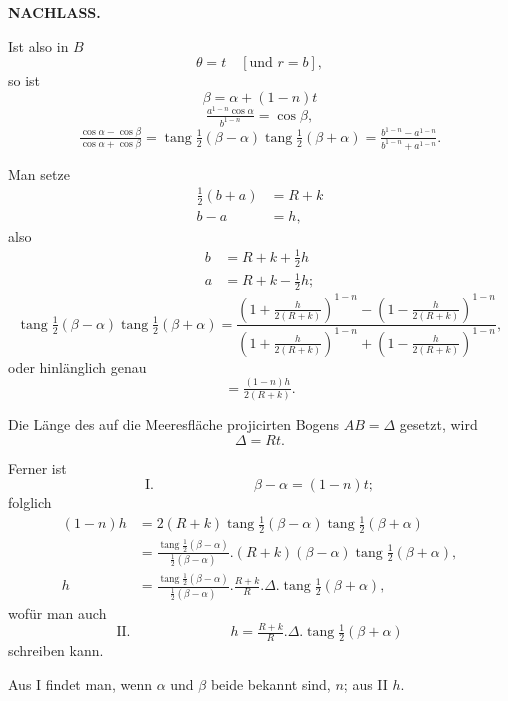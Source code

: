 \par\clearpage
\noindent{}\hfill{\small\textbf{NACHLASS.}}\hfill\null\par\medskip
\begingroup
\setlength{\abovedisplayskip}{4pt}\setlength{\belowdisplayskip}{4pt}
\setlength{\abovedisplayshortskip}{2pt}\setlength{\belowdisplayshortskip}{2pt}
\par\noindent\hspace*{\parindent}Ist also in \(B\)
\[\theta=t\quad[\text{und }r=b],\]
\noindent so ist
\[\beta=\alpha+(1-n)t\]
\noindent [und]
\[\tfrac{a^{1-n}\cos\alpha}{b^{1-n}}=\cos\beta,\]
\[\tfrac{\cos\alpha-\cos\beta}{\cos\alpha+\cos\beta}=\operatorname{tang}\tfrac12(\beta-\alpha)\operatorname{tang}\tfrac12(\beta+\alpha)=\tfrac{b^{1-n}-a^{1-n}}{b^{1-n}+a^{1-n}}.\]
\par\noindent\hspace*{\parindent}Man setze
\[\begin{aligned}\tfrac12(b+a)&=R+k\\b-a&=h,\end{aligned}\]
\noindent also
\[\begin{aligned}b&=R+k+\tfrac12h\\a&=R+k-\tfrac12h;\end{aligned}\]
\[\operatorname{tang}\tfrac12(\beta-\alpha)\operatorname{tang}\tfrac12(\beta+\alpha)=\frac{\left(1+\tfrac{h}{2(R+k)}\right)^{1-n}-\left(1-\tfrac{h}{2(R+k)}\right)^{1-n}}{\left(1+\tfrac{h}{2(R+k)}\right)^{1-n}+\left(1-\tfrac{h}{2(R+k)}\right)^{1-n}},\]
\noindent oder hinlänglich genau
\[=\tfrac{(1-n)h}{2(R+k)}.\]
\par\noindent\hspace*{\parindent}Die Länge des auf die Meeresfläche projicirten Bogens \(AB=\Delta\) gesetzt, wird
\[\Delta=Rt.\]
\par\noindent\hspace*{\parindent}Ferner ist
\[\text{I.}\hspace{3cm}\beta-\alpha=(1-n)t;\]
\noindent folglich
\[\begin{aligned}
(1-n)h&=2(R+k)\operatorname{tang}\tfrac12(\beta-\alpha)\operatorname{tang}\tfrac12(\beta+\alpha)\\
&=\tfrac{\operatorname{tang}\frac12(\beta-\alpha)}{\frac12(\beta-\alpha)}.(R+k)(\beta-\alpha)\operatorname{tang}\tfrac12(\beta+\alpha),\\
h&=\tfrac{\operatorname{tang}\frac12(\beta-\alpha)}{\frac12(\beta-\alpha)}.\tfrac{R+k}{R}.\Delta.\operatorname{tang}\tfrac12(\beta+\alpha),
\end{aligned}\]
\noindent wofür man auch
\[\text{II.}\hspace{3cm}h=\tfrac{R+k}{R}.\Delta.\operatorname{tang}\tfrac12(\beta+\alpha)\]
\noindent schreiben kann.
\par\noindent\hspace*{\parindent}Aus I findet man, wenn \(\alpha\) und \(\beta\) beide bekannt sind, \(n\); aus II \(h\).
\endgroup


